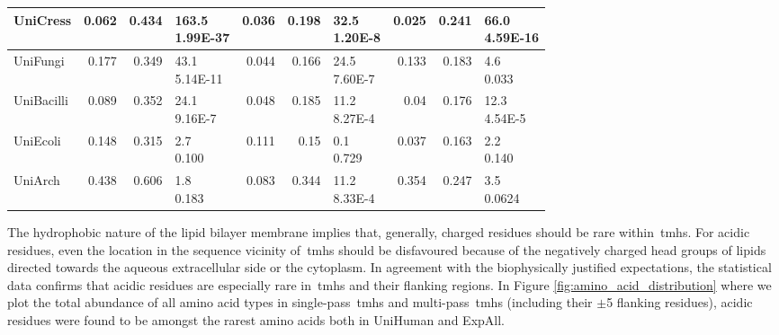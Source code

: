 \begin{table}[htbp]
{\begin{tabular}{p{5em}rrp{5em}rrp{5em}rrp{5em}}
    \midrule
    UniCress & 0.062 & 0.434 & \specialcell{163.5 \\ 1.99E-37} & 0.036 & 0.198 & \specialcell{32.5 \\ 1.20E-8} & 0.025 & 0.241 & \specialcell{66.0 \\ 4.59E-16} \\
    \midrule
    UniFungi & 0.177 & 0.349 & \specialcell{43.1 \\ 5.14E-11} & 0.044 & 0.166 & \specialcell{24.5 \\ 7.60E-7} & 0.133 & 0.183 & \specialcell{4.6 \\ 0.033 }\\
    \midrule
    UniBacilli & 0.089 & 0.352 & \specialcell{24.1 \\ 9.16E-7} & 0.048 & 0.185 & \specialcell{11.2 \\ 8.27E-4} & 0.04  & 0.176 & \specialcell{12.3 \\ 4.54E-5} \\
    \midrule
    UniEcoli & 0.148 & 0.315 & \specialcell{2.7 \\ 0.100} & 0.111 & 0.15  & \specialcell{0.1 \\ 0.729 }& 0.037 & 0.163 & \specialcell{2.2 \\ 0.140 }\\
    \midrule
    UniArch & 0.438 & 0.606 & \specialcell{1.8 \\ 0.183} & 0.083 & 0.344 & \specialcell{11.2 \\ 8.33E-4} & 0.354 & 0.247 & \specialcell{3.5 \\ 0.0624 }\\
    \bottomrule
   \end{tabular}}%
   \label{table:acidicresiduesarerare}

\end{table}%

The hydrophobic nature of the lipid bilayer membrane implies that, generally, charged residues should be rare within~\gls{tmh}s.
For acidic residues, even the location in the sequence vicinity of~\gls{tmh}s should be disfavoured because of the negatively charged head groups of lipids directed towards the aqueous extracellular side or the cytoplasm.
In agreement with the biophysically justified expectations, the statistical data confirms that acidic residues are especially rare in~\gls{tmh}s and their flanking regions.
In Figure \ref{fig:amino_acid_distribution} where we plot the total abundance of all amino acid types in single-pass~\gls{tmh}s and multi-pass~\gls{tmh}s (including their $\pm$5 flanking residues), acidic residues were found to be amongst the rarest amino acids both in UniHuman and ExpAll.

